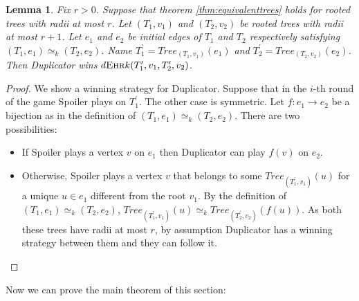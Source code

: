 \documentclass[12pt,notitlepage,a4paper]{article}
\newtheorem{lemma}{Lemma}[section]
\theoremstyle{definition}
\newcommand{\ehr}{\textsc{Ehr}}
\begin{document}
\begin{lemma} \label{lem:equivalentedges}
	Fix $r>0$. Suppose that theorem \ref{thm:equivalenttrees}
	holds for rooted trees with radii at most $r$.
	Let $(T_1,v_1)$ and $(T_2,v_2)$ be rooted trees with radii
	at most $r+1$. Let $e_1$ and $e_2$ be initial edges 
	of $T_1$ and $T_2$ respectively satisfying 
	$(T_1,e_1)\simeq_k (T_2,e_2)$. Name 
	$T^\prime_1=Tree_{(T_1,v_1)}(e_1)$ and 
	$T^\prime_2=Tree_{(T_2,v_2)}(e_2)$. Then
	Duplicator wins $d\ehr{k}(T^\prime_1, v_1, T^\prime_2,v_2)$.
\end{lemma}
\begin{proof}
	We show a winning strategy for Duplicator. 
	Suppose that in the $i$-th round of the game Spoiler
	plays on $T^\prime_1$. The other case is symmetric. Let
	$f:e_1\rightarrow e_2$ be a bijection as in the definition
	of $(T_1,e_1)\simeq_k (T_2,e_2)$. There are two possibilities:
	\begin{itemize}
		\item If Spoiler plays a vertex $v$ on $e_1$ 
		then Duplicator can play $f(v)$ on $e_2$. 
		\item Otherwise, Spoiler plays a vertex $v$ that belongs
		to some $Tree_{(T^\prime_1,v_1)}(u)$ for a unique $u\in e_1$
		different from the root $v_1$.
		By the definition of $(T_1,e_1)\simeq_k (T_2,e_2)$,
		$Tree_{(T^\prime_1,v_1)}(u)\simeq_k 
		Tree_{(T^\prime_2,v_2)}(f(u))$. As both these trees
		have radii at most $r$, by assumption Duplicator has a winning 
		strategy between them and they can follow it.		
	\end{itemize}
\end{proof}

Now we can prove the main theorem of this section:
\end{document}
